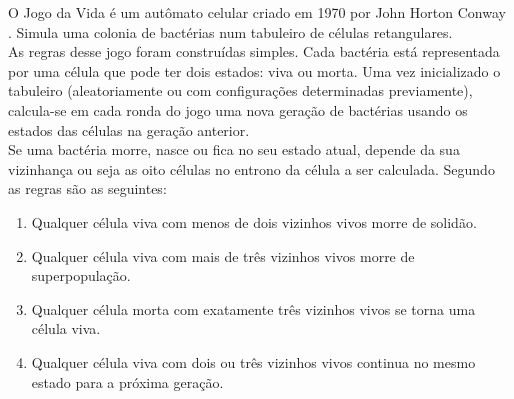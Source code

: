O Jogo da Vida é um autômato celular criado em 1970 por John Horton Conway \cite{wikipedia}. Simula uma colonia de bactérias num tabuleiro de células retangulares.\\

As regras desse jogo foram construídas simples. Cada bactéria está representada por uma célula que pode ter dois estados: viva ou morta. Uma vez inicializado o tabuleiro (aleatoriamente ou com configurações determinadas previamente), calcula-se em cada ronda do jogo uma nova geração de bactérias usando os estados das células na geração anterior.\\

Se uma bactéria morre, nasce ou fica no seu estado atual, depende da sua vizinhança ou seja as oito células no entrono da célula a ser calculada. Segundo \cite{wikipedia} as regras são as seguintes:
\begin{enumerate}

 \item Qualquer célula viva com menos de dois vizinhos vivos morre de solidão.
 \item   Qualquer célula viva com mais de três vizinhos vivos morre de superpopulação.
 \item   Qualquer célula morta com exatamente três vizinhos vivos se torna uma célula viva.
 \item   Qualquer célula viva com dois ou três vizinhos vivos continua no mesmo estado para a próxima geração.

\end{enumerate}

